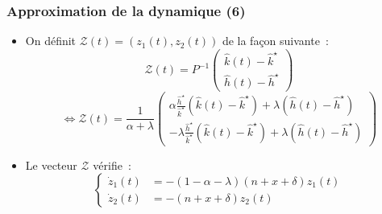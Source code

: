 \documentclass[10pt,notheorems]{beamer}
\theoremstyle{plain}
\theoremstyle{definition} %
\begin{document}
\begin{frame}
  \frametitle{Approximation de la dynamique (6)}

  \begin{itemize}

  \item On définit $\mathcal Z(t)=(z_1(t),z_2(t))$ de la façon suivante~:
    \[
      \mathcal Z(t) = P^{-1}
      \begin{pmatrix}
        \hat k(t) - \hat k^\star\\
        \hat h(t) - \hat h^\star
      \end{pmatrix}
    \]
    \medskip
    \[
      \Leftrightarrow \mathcal Z(t) = \frac{1}{\alpha+\lambda}
      \begin{pmatrix}
        \alpha\frac{\hat h^\star}{\hat k^\star}\left(\hat k(t) - \hat k^\star\right)+\lambda \left(\hat h(t) - \hat h^\star\right)\\
        -\lambda\frac{\hat h^\star}{\hat k^\star}\left(\hat k(t) - \hat k^\star\right)+\lambda\left(\hat h(t) - \hat h^\star\right)
      \end{pmatrix}
    \]

    \bigskip

  \item Le vecteur $\mathcal Z$ vérifie~:
    \[
      \begin{cases}
        \dot z_1(t) &= -(1-\alpha-\lambda)(n+x+\delta)z_{1}(t)\\
        \dot z_2(t) &= -(n+x+\delta) z_2(t)
      \end{cases}
    \]

  \end{itemize}
\end{frame}
\end{document}
